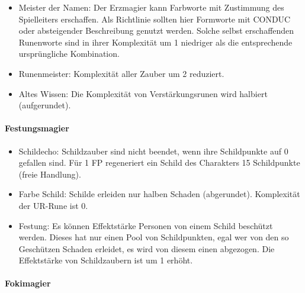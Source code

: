 \documentclass{article}
\begin{document}
\begin{itemize}
\item Meister der Namen: Der Erzmagier kann Farbworte mit Zustimmung des Spielleiters erschaffen. Als Richtlinie sollten hier Formworte mit CONDUC oder absteigender Beschreibung genutzt werden. Solche selbst erschaffenden Runenworte sind in ihrer Komplexität um 1 niedriger als die entsprechende ursprüngliche Kombination.
\item Runenmeister: Komplexität aller Zauber um 2 reduziert.
\item Altes Wissen: Die Komplexität von Verstärkungsrunen wird halbiert (aufgerundet).
\end{itemize}

\paragraph{Festungsmagier}

\begin{itemize}
\item Schildecho: Schildzauber sind nicht beendet, wenn ihre Schildpunkte auf 0 gefallen sind. Für 1 FP regeneriert ein Schild des Charakters 15 Schildpunkte (freie Handlung).
\item Farbe Schild: Schilde erleiden nur halben Schaden (abgerundet). Komplexität der UR-Rune ist 0.
\item Festung: Es können Effektstärke Personen von einem Schild beschützt werden. Dieses hat nur einen Pool von Schildpunkten, egal wer von den so Geschützen Schaden erleidet, es wird von diesem einen abgezogen. Die Effektstärke von Schildzaubern ist um 1 erhöht.
\end{itemize}

\paragraph{Fokimagier}
\end{document}
